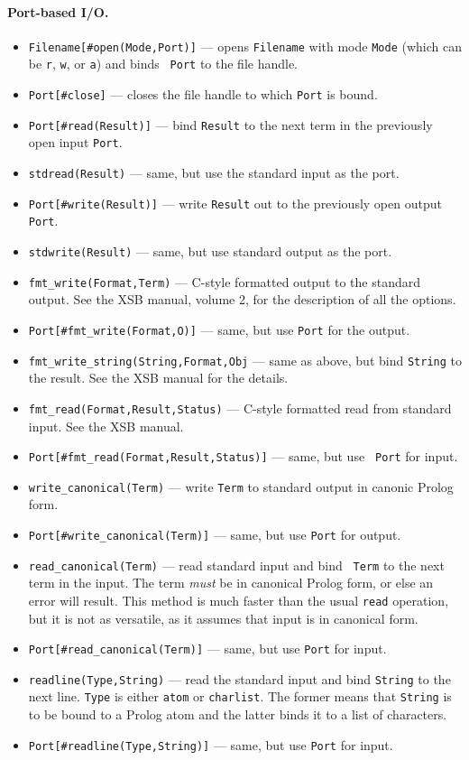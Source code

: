 \documentclass[11pt]{article}
\begin{document}
\paragraph{Port-based I/O.}
\begin{itemize}
\item  {\tt Filename[\#open(Mode,Port)]} --- opens {\tt Filename} with mode
  {\tt Mode} (which can be {\tt r}, {\tt w}, or {\tt a}) and binds {\tt
  Port} to the file handle.
\item {\tt Port[\#close]} --- closes the file handle to which {\tt Port} is
  bound.
\item {\tt Port[\#read(Result)]} --- bind {\tt Result} to the next term
  in the previously open input {\tt Port}.
\item {\tt stdread(Result)} --- same, but use the standard input as the port.
\item {\tt Port[\#write(Result)]} --- write {\tt Result} out to the
  previously open output {\tt Port}.
\item {\tt stdwrite(Result)} --- same, but use standard output as the port.
\item {\tt fmt\_write(Format,Term)} --- C-style formatted output to the
  standard output. See the XSB manual, volume 2, for the description of all
  the options.
\item {\tt Port[\#fmt\_write(Format,O)]} --- same, but use {\tt Port} for the
  output. 
\item {\tt fmt\_write\_string(String,Format,Obj} --- same as above, but bind
  {\tt String} to the result. See the XSB manual for the details.
\item {\tt fmt\_read(Format,Result,Status)} --- C-style formatted read from
  standard input. See the XSB manual.
\item {\tt Port[\#fmt\_read(Format,Result,Status)]}  ---  same, but use {\tt
    Port} for input.
\item {\tt write\_canonical(Term)} --- write {\tt Term} to standard output
  in canonic Prolog form.
\item {\tt Port[\#write\_canonical(Term)]} --- same, but use {\tt Port} for
  output.
\item {\tt read\_canonical(Term)} --- read standard input and bind {\tt
    Term} to the next term in the input. The term \emph{must} be in
  canonical Prolog form, or else an error will result. This method is much
  faster than the usual {\tt read} operation, but it is not as versatile,
  as it assumes that input is in canonical form.
\item {\tt Port[\#read\_canonical(Term)]} --- same, but use {\tt Port} for
  input.
\item {\tt readline(Type,String)} --- read the standard input and bind
  {\tt String} to the next line. {\tt Type} is either {\tt atom} or
  {\tt charlist}. The former means that {\tt String} is to be bound to a
  Prolog atom and the latter binds it to a list of characters.
\item {\tt Port[\#readline(Type,String)]} --- same, but use {\tt Port} for
  input.
\end{itemize}
\end{document}
